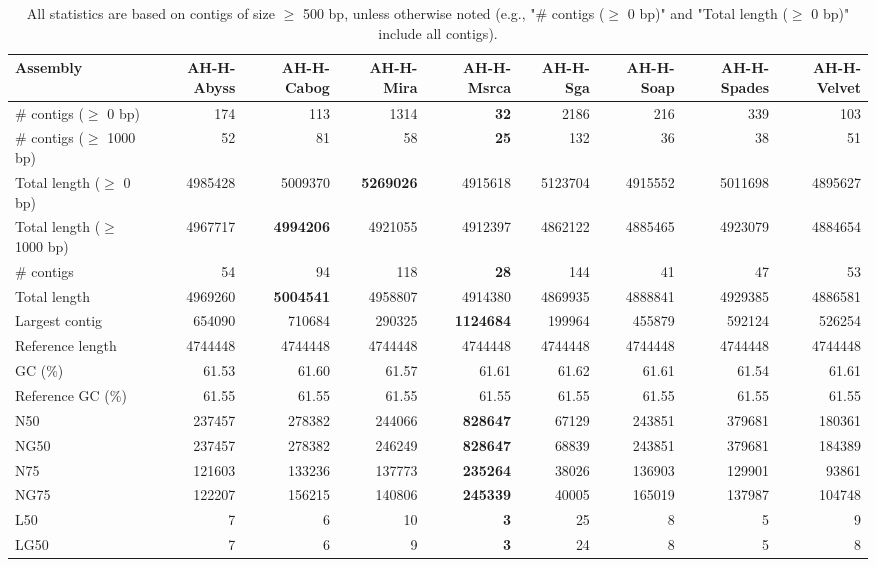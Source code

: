 \documentclass[12pt,a4paper]{article}
\begin{document}
\begin{table}[ht]
\begin{center}
\caption{All statistics are based on contigs of size $\geq$ 500 bp, unless otherwise noted (e.g., "\# contigs ($\geq$ 0 bp)" and "Total length ($\geq$ 0 bp)" include all contigs).}
\begin{tabular}{|l*{8}{|r}|}
\hline
Assembly & AH-H-Abyss & AH-H-Cabog & AH-H-Mira & AH-H-Msrca & AH-H-Sga & AH-H-Soap & AH-H-Spades & AH-H-Velvet \\ \hline
\# contigs ($\geq$ 0 bp) & 174 & 113 & 1314 & {\bf 32} & 2186 & 216 & 339 & 103 \\ \hline
\# contigs ($\geq$ 1000 bp) & 52 & 81 & 58 & {\bf 25} & 132 & 36 & 38 & 51 \\ \hline
Total length ($\geq$ 0 bp) & 4985428 & 5009370 & {\bf 5269026} & 4915618 & 5123704 & 4915552 & 5011698 & 4895627 \\ \hline
Total length ($\geq$ 1000 bp) & 4967717 & {\bf 4994206} & 4921055 & 4912397 & 4862122 & 4885465 & 4923079 & 4884654 \\ \hline
\# contigs & 54 & 94 & 118 & {\bf 28} & 144 & 41 & 47 & 53 \\ \hline
Total length & 4969260 & {\bf 5004541} & 4958807 & 4914380 & 4869935 & 4888841 & 4929385 & 4886581 \\ \hline
Largest contig & 654090 & 710684 & 290325 & {\bf 1124684} & 199964 & 455879 & 592124 & 526254 \\ \hline
Reference length & 4744448 & 4744448 & 4744448 & 4744448 & 4744448 & 4744448 & 4744448 & 4744448 \\ \hline
GC (\%) & 61.53 & 61.60 & 61.57 & 61.61 & 61.62 & 61.61 & 61.54 & 61.61 \\ \hline
Reference GC (\%) & 61.55 & 61.55 & 61.55 & 61.55 & 61.55 & 61.55 & 61.55 & 61.55 \\ \hline
N50 & 237457 & 278382 & 244066 & {\bf 828647} & 67129 & 243851 & 379681 & 180361 \\ \hline
NG50 & 237457 & 278382 & 246249 & {\bf 828647} & 68839 & 243851 & 379681 & 184389 \\ \hline
N75 & 121603 & 133236 & 137773 & {\bf 235264} & 38026 & 136903 & 129901 & 93861 \\ \hline
NG75 & 122207 & 156215 & 140806 & {\bf 245339} & 40005 & 165019 & 137987 & 104748 \\ \hline
L50 & 7 & 6 & 10 & {\bf 3} & 25 & 8 & 5 & 9 \\ \hline
LG50 & 7 & 6 & 9 & {\bf 3} & 24 & 8 & 5 & 8 \\ \hline

\end{tabular}
\end{center}
\end{table}
\end{document}
